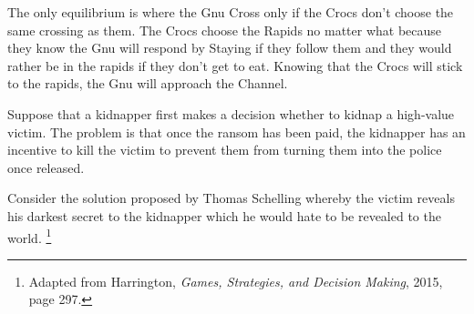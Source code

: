 \documentclass[addpoints]{exam}
\begin{document}
\begin{questions}
\begin{parts}
\begin{solution}
    The only equilibrium is where the Gnu Cross only if the Crocs don't choose the same crossing as them.
    The Crocs choose the Rapids no matter what because they know the Gnu will respond by Staying if they follow them and they would rather be in the rapids if they don't get to eat.
    Knowing that the Crocs will stick to the rapids, the Gnu will approach the Channel.
  \end{solution}

\end{parts}

\newpage

\question
Suppose that a kidnapper first makes a decision whether to kidnap a high-value victim.
The problem is that once the ransom has been paid, the kidnapper has an incentive to kill the victim 
to prevent them from turning them into the police once released.

Consider the solution proposed by Thomas Schelling whereby the victim reveals his darkest secret 
to the kidnapper which he would hate to be revealed to the world.
\footnote{Adapted from Harrington, \textit{Games, Strategies, and Decision Making}, 2015, page 297.}

\begin{center}
  
\end{center}


\end{questions}
\end{document}
